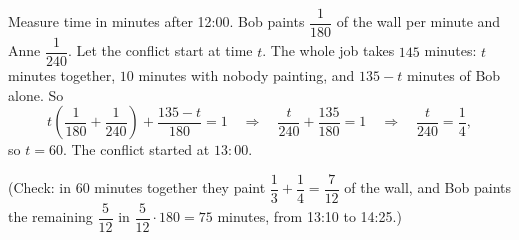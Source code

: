 Measure time in minutes after 12:00. Bob paints $\dfrac{1}{180}$ of the wall per minute and Anne $\dfrac{1}{240}$. Let the conflict start at time $t$. The whole job takes $145$ minutes: $t$ minutes together, $10$ minutes with nobody painting, and $135-t$ minutes of Bob alone. So
\[
t\left(\dfrac{1}{180}+\dfrac{1}{240}\right)+\dfrac{135-t}{180}=1\quad\Longrightarrow\quad\dfrac{t}{240}+\dfrac{135}{180}=1\quad\Longrightarrow\quad\dfrac {t}{240}=\dfrac{1}{4} ,
\]
so $t=60$. The conflict started at $\boxed{13\!:\!00}$.

(Check: in $60$ minutes together they paint $\dfrac{1}{3}+\dfrac{1}{4}=\dfrac{7}{12}$ of the wall, and Bob paints the remaining $\dfrac{5}{12}$ in $\dfrac{5}{12}\cdot180=75$ minutes, from 13:10 to 14:25.)
